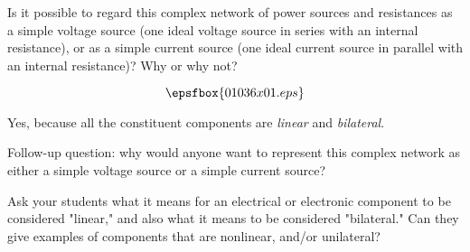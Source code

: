 

Is it possible to regard this complex network of power sources and resistances as a simple voltage source (one ideal voltage source in series with an internal resistance), or as a simple current source (one ideal current source in parallel with an internal resistance)?  Why or why not?

$$\epsfbox{01036x01.eps}$$







Yes, because all the constituent components are {\it linear} and {\it bilateral}.

\vskip 10pt

Follow-up question: why would anyone want to represent this complex network as either a simple voltage source or a simple current source?







Ask your students what it means for an electrical or electronic component to be considered "linear," and also what it means to be considered "bilateral."  Can they give examples of components that are nonlinear, and/or unilateral?




